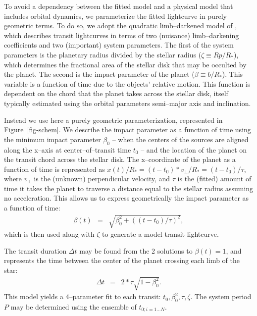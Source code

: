 \medskip
{\centerline{}}
\smallskip

To avoid a dependency between the fitted model and a physical model
that includes orbital dynamics, we parameterize the fitted lightcurve
in purely geometric terms.  To do so, we adopt the quadratic
limb--darkened model of \cite{2002ApJ...580L.171M}, which describes
transit lightcurves in terms of two (nuisance) limb--darkening
coefficients and two (important) system parameters.  The first of the
system parameters is the planetary radius divided by the stellar
radius ($\zeta \equiv Rp/R_*$), which determines the fractional area
of the stellar disk that may be occulted by the planet.  The second is
the impact parameter of the planet ($\beta \equiv b/R_*$).  This
variable is a function of time due to the objects' relative motion.
This function is dependent on the chord that the planet takes across
the stellar disk, itself typically estimated using the orbital
parameters semi--major axis and inclination.

Instead we use here a purely geometric parameterization, represented
in Figure~\ref{fig-schem}.  We describe the impact parameter as a
function of time using the minimum impact parameter $\beta_0$ -- when
the centers of the sources are aligned along the x--axis at
center--of--transit time $t_0$ -- and the location of the planet on
the transit chord across the stellar disk.  The x--coordinate of the
planet as a function of time is represented as $x(t) / R_* = (t - t_0)
* v_\perp / R_* = (t - t_0) / \tau$, where $v_\perp$ is the (unknown)
perpendicular velocity, and $\tau$ is the (fitted) amount of time it
takes the planet to traverse a distance equal to the stellar radius
assuming no acceleration.  This allows us to express geometrically the
impact parameter as a function of time:
\begin{eqnarray}
\beta(t) & = & \sqrt{\beta_0^2 + \left((t - t_0) / \tau\right)^2},
\end{eqnarray}
which is then used along with $\zeta$ to generate a model transit
lightcurve.

The transit duration $\Delta t$ may be found from the 2 solutions to
$\beta(t) = 1$, and represents the time between the center of the
planet crossing each limb of the star:
\begin{eqnarray}
\Delta t & = & 2 * \tau \sqrt{1 - \beta_0^2}.
\label{eq-dt}
\end{eqnarray}
This model yields a 4--parameter fit to each transit: $t_0, \beta_0^2,
\tau, \zeta$.  The system period $P$ may be determined using the
ensemble of $t_{0;i=1...N}$.

